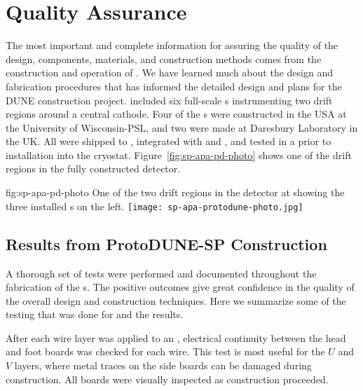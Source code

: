 \section{Quality Assurance}
\label{sec:fdsp-apa-qa}


The most important and complete information for assuring the quality of the  design, components, materials, and construction methods comes from the construction and operation of .  We have learned much about the design and fabrication procedures that has informed the detailed design and plans for the DUNE  construction project.  included six full-scale  s instrumenting two drift regions around a central cathode.  Four of the  s were constructed in the USA at the University of Wisconsin-PSL, and two were made at Daresbury Laboratory in the UK. All were shipped to , integrated with  and , and tested in a \coldbox prior to installation into the  cryostat.  Figure~\ref{fig:sp-apa-pd-photo} shows one of the drift regions in the fully constructed  detector.

\begin{dunefigure}{fig:sp-apa-pd-photo}
{One of the two drift regions in the  detector at  showing the three installed s on the left.}
\texttt{[image: sp-apa-protodune-photo.jpg]}
\end{dunefigure}


\subsection{Results from ProtoDUNE-SP Construction}
\label{sec:fdsp-apa-qa-protodune-const}

A thorough set of  tests were performed and documented throughout the fabrication of the  s.  The positive outcomes give great confidence in the quality of the overall  design  and construction techniques.  Here we summarize some of the testing that was done for  and the results.   


After each wire layer was applied to an , electrical continuity between the head and foot boards was checked for each wire.  This test is most useful for the $U$ and $V$ layers, where metal traces on the side boards can be damaged during construction. All boards were visually inspected as construction proceeded.

